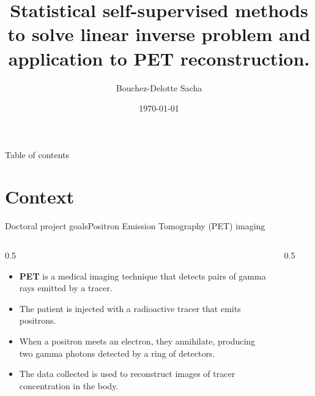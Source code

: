 \documentclass{beamer}
\title[]{Statistical self-supervised methods to solve linear inverse problem and application to PET reconstruction.}
\author{Bouchez-Delotte Sacha}
\date{\today}
\numberwithin{proposition}{section}
\begin{document}
\begin{frame}
    \titlepage
\end{frame}

\begin{frame}{Table of contents}
    \tableofcontents
\end{frame}

\section{Context}

%

\begin{frame}{Doctoral project goals}{Positron Emission Tomography (PET) imaging}
    \begin{columns}
        \begin{column}{0.5\textwidth}
            \begin{itemize}
                \item \textbf{PET} is a medical imaging technique that detects pairs of gamma rays emitted by a tracer.
                \item The patient is injected with a radioactive tracer that emits positrons.
                \item When a positron meets an electron, they annihilate, producing two gamma photons detected by a ring of detectors.
                \item The data collected is used to reconstruct images of tracer concentration in the body.
            \end{itemize}
        \end{column}
        \begin{column}{0.5\textwidth}
            \centering
             \begin{figure}
\end{figure}
\end{column}
\end{columns}
\end{frame}
\end{document}
